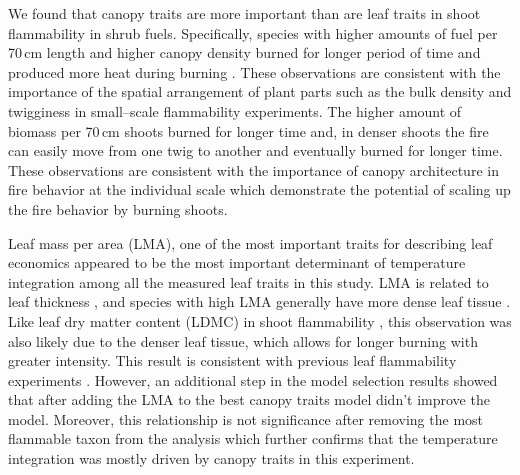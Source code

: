 \documentclass{ttuthes2007}
\begin{document}
\noindent We found that canopy traits are more important than are leaf traits in shoot flammability in shrub fuels. %
Specifically, species with higher amounts of fuel per 70\,cm length and higher canopy density burned for longer period of time and produced more heat during burning . These observations are consistent with the importance of the spatial arrangement of plant parts such as the bulk density \citep{pausas2012firesulex} and twigginess \citep{potts2022growth} in small--scale flammability experiments. The higher amount of biomass per 70\,cm shoots burned for longer time and, in denser shoots the fire can easily move from one twig to another and eventually burned for longer time. These observations are  consistent with the importance of canopy architecture in fire behavior at the individual scale \citep{madrigal2012evaluation} which demonstrate the potential of scaling up the fire behavior by burning shoots.





\noindent Leaf mass per area (LMA), one of the most important traits for describing leaf economics %
\citep{wright2004worldwide} appeared to be the most important determinant of temperature integration among all the measured leaf traits in this study. LMA is related to leaf thickness \citep{niinemets1999research}, and species with high LMA generally have more dense leaf tissue \citep{poorter2009causes}. Like leaf dry matter content (LDMC) in shoot flammability \citep{alam2020shoot, potts2022growth}, this observation
was also likely due to the denser leaf tissue, which allows for longer burning with greater intensity. This result is consistent with previous leaf flammability experiments \citep{krix2018landscape}.
However, an additional step in the model selection results showed that after adding the LMA to the best canopy traits model didn't improve the model.
Moreover, this relationship is not significance %
after removing the most flammable taxon from the analysis which further confirms that the temperature integration was mostly driven by canopy traits in this experiment.\\
\end{document}
